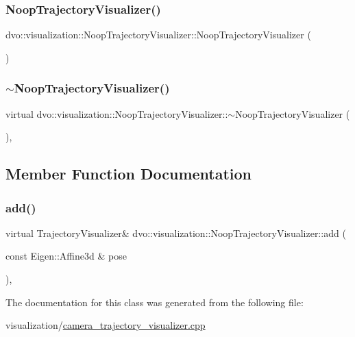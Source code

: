 \subsubsection{\texorpdfstring{Noop\+Trajectory\+Visualizer()}{NoopTrajectoryVisualizer()}}
{\footnotesize\ttfamily dvo\+::visualization\+::\+Noop\+Trajectory\+Visualizer\+::\+Noop\+Trajectory\+Visualizer (\begin{DoxyParamCaption}{ }\end{DoxyParamCaption})\hspace{0.3cm}{\ttfamily [inline]}}

\mbox{\label{classdvo_1_1visualization_1_1_noop_trajectory_visualizer_a2f3efe6c4bb5b294c72c594ef13060ca}} 
\subsubsection{\texorpdfstring{$\sim$\+Noop\+Trajectory\+Visualizer()}{~NoopTrajectoryVisualizer()}}
{\footnotesize\ttfamily virtual dvo\+::visualization\+::\+Noop\+Trajectory\+Visualizer\+::$\sim$\+Noop\+Trajectory\+Visualizer (\begin{DoxyParamCaption}{ }\end{DoxyParamCaption})\hspace{0.3cm}{\ttfamily [inline]}, {\ttfamily [virtual]}}



\subsection{Member Function Documentation}
\mbox{\label{classdvo_1_1visualization_1_1_noop_trajectory_visualizer_a40e9cfd01744c3efa85afb93237e2030}} 
\subsubsection{\texorpdfstring{add()}{add()}}
{\footnotesize\ttfamily virtual Trajectory\+Visualizer\& dvo\+::visualization\+::\+Noop\+Trajectory\+Visualizer\+::add (\begin{DoxyParamCaption}\item[{const Eigen\+::\+Affine3d \&}]{pose }\end{DoxyParamCaption})\hspace{0.3cm}{\ttfamily [inline]}, {\ttfamily [virtual]}}



The documentation for this class was generated from the following file\+:\begin{DoxyCompactItemize}
\item 
visualization/\mbox{\hyperlink{camera__trajectory__visualizer_8cpp}{camera\+\_\+trajectory\+\_\+visualizer.\+cpp}}\end{DoxyCompactItemize}
